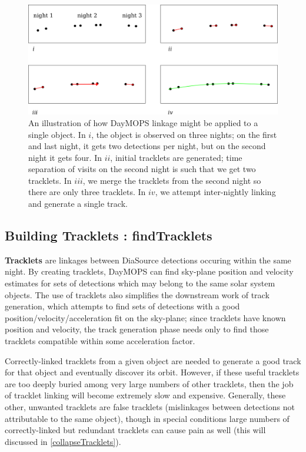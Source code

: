 \begin{figure}[ht]
  \centering
    \includegraphics[width=16cm]{illustrations/oneObjectMops.png}
    \caption[Example dayMOPS linkages.]{An illustration of how DayMOPS linkage might be applied
      to a single object.  In $i$, the object is observed on three
      nights; on the first and last night, it gets two detections per
      night, but on the second night it gets four.  In $ii$, initial
      tracklets are generated; time separation of visits on the second
      night is such that we get two tracklets.  In $iii$, we merge the
      tracklets from the second night so there are only three
      tracklets.  In $iv$, we attempt inter-nightly linking and
      generate a single track.}
\label{objectLinking}
\end{figure}



\subsection{Building Tracklets : findTracklets}

\textbf{Tracklets} are linkages between DiaSource detections occuring
within the same night. By creating tracklets, DayMOPS can find
sky-plane position and velocity estimates for sets of detections which
may belong to the same solar system objects.  The use of tracklets
also simplifies the downstream work of track generation, which
attempts to find sets of detections with a good
position/velocity/acceleration fit on the sky-plane; since tracklets
have known position and velocity, the track generation phase needs
only to find those tracklets compatible within some acceleration
factor.

Correctly-linked tracklets from a given object are needed to generate
a good track for that object and eventually discover its orbit.
However, if these useful tracklets are too deeply buried among very
large numbers of other tracklets, then the job of tracklet linking
will become extremely slow and expensive.  Generally, these other,
unwanted tracklets are false tracklets (mislinkages between detections
not attributable to the same object), though in special conditions
large numbers of correctly-linked but redundant tracklets can cause
pain as well (this will discussed in \ref{collapseTracklets}).

